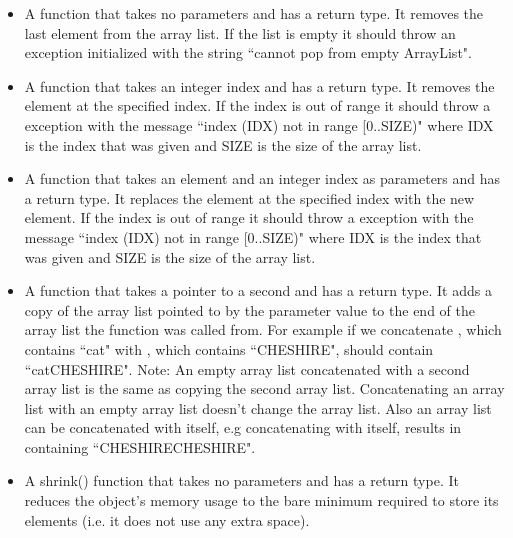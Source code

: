 \documentclass[11pt]{report}
\begin{document}
\begin{itemize}
    \item A  function that takes no parameters and has a 
      return type.  It removes the last element from the array list.  If
      the list is empty it should throw an  exception
      initialized with the string ``cannot pop from empty ArrayList".

    \item A  function that takes an integer index and has a 
      return type.  It removes the element at the specified index.  If
      the index is out of range it should throw a 
      exception with the message ``index (IDX) not in range [0..SIZE)"
      where IDX is the index that was given and SIZE is the size of the
      array list.

    \item A  function that takes an element  and an integer
      index as parameters and has a  return type.  It replaces the
      element at the specified index with the new element.  If the index
      is out of range it should throw a  exception with
      the message ``index (IDX) not in range [0..SIZE)" where IDX is the
      index that was given and SIZE is the size of the array list.

    \item A  function that takes a pointer to a second
       and has a  return type.  It adds a copy of the
      array list pointed to by the parameter value to the end of the
      array list the function was called from.  For example if we
      concatenate , which contains ``cat" with
      , which contains ``CHESHIRE", 
      should contain ``catCHESHIRE".  Note: An empty array list
      concatenated with a second array list is the same as copying the
      second array list.  Concatenating an array list with an empty
      array list doesn't change the array list.  Also an array list can
      be concatenated with itself, e.g concatenating 
      with itself, results in  containing
      ``CHESHIRECHESHIRE".
      
    \item A shrink() function that takes no parameters and has a  return
      type.  It reduces the object's memory usage to the bare minimum
      required to store its elements (i.e. it does not use any extra
      space).
\end{itemize}
\end{document}
